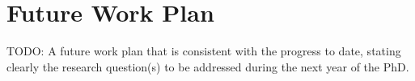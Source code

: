 \section{Future Work Plan}
TODO: A future work plan that is consistent with the progress to date, stating clearly the research question(s) to be addressed during the next year of the PhD.
